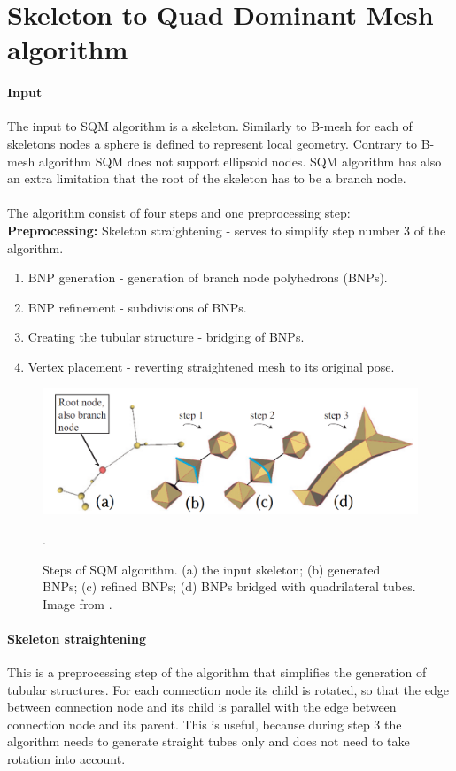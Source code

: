 \section{Skeleton to Quad Dominant Mesh algorithm}
\paragraph{Input}
The input to SQM algorithm is a skeleton. Similarly to B-mesh for each of skeletons nodes a sphere is defined to represent local geometry. Contrary to B-mesh algorithm SQM does not support ellipsoid nodes. SQM algorithm has also an extra limitation that the root of the skeleton has to be a branch node.
\paragraph{}
The algorithm consist of four steps and one preprocessing step:\\
\textbf{Preprocessing:} Skeleton straightening - serves to simplify step number 3 of the algorithm.
\begin{enumerate}
	\itemsep-0.25em 
	\item BNP generation - generation of branch node polyhedrons (BNPs).
	\item BNP refinement - subdivisions of BNPs.
	\item Creating the tubular structure - bridging of BNPs.
	\item Vertex placement - reverting straightened mesh to its original pose.
\end{enumerate}

\begin{figure}[h]
    \centering
    \includegraphics[width=\textwidth]{images/sqm_viz.png}
    \caption[Steps of SQM algorithm]{Steps of SQM algorithm. (a) the input skeleton; (b) generated BNPs; (c) refined BNPs; (d) BNPs bridged with quadrilateral tubes. Image from \cite{sqm}.}.
    \label{fig:sqm_algorithm_steps}
\end{figure}

\paragraph{Skeleton straightening}
This is a preprocessing step of the algorithm that simplifies the generation of tubular structures. For each connection node its child is rotated, so that the edge between connection node and its child is parallel with the edge between connection node and its parent. This is useful, because during step 3 the algorithm needs to generate straight tubes only and does not need to take rotation into account.

